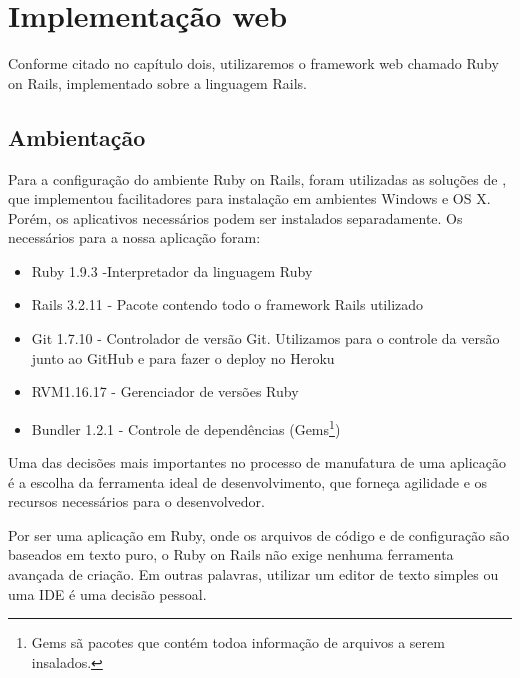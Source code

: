 
 
  \chapter{Implementação web} \label{CHP:RAILS}%
            Conforme citado no capítulo dois, utilizaremos o framework web chamado Ruby on Rails, implementado sobre a linguagem Rails.
    \section{Ambientação}
     
    Para a configuração do ambiente Ruby on Rails, foram utilizadas as soluções de \cite{railsinstaller}, que implementou facilitadores para instalação em ambientes Windows e OS X. Porém, os aplicativos necessários podem ser instalados separadamente. Os necessários para a nossa aplicação foram:
\begin{itemize}
\item Ruby 1.9.3 -Interpretador da linguagem Ruby
\item Rails 3.2.11 - Pacote contendo todo o framework Rails utilizado
\item Git 1.7.10 - Controlador de versão Git. Utilizamos para o controle da versão junto ao GitHub e para fazer o deploy no Heroku
\item RVM1.16.17 - Gerenciador de versões Ruby
\item Bundler 1.2.1 - Controle de dependências (Gems\footnote{Gems sã pacotes que contém todoa informação de arquivos a serem insalados.})
\end{itemize}     
    Uma das decisões mais importantes no processo de manufatura de uma aplicação é a escolha da ferramenta ideal de desenvolvimento, que forneça agilidade e os recursos necessários para o desenvolvedor.
	
    Por ser uma aplicação em Ruby, onde os arquivos de código e de configuração são baseados em texto puro, o Ruby on Rails não exige nenhuma ferramenta avançada de criação.     Em outras palavras, utilizar um editor de texto simples ou uma \ac{IDE} é uma decisão pessoal.
	
